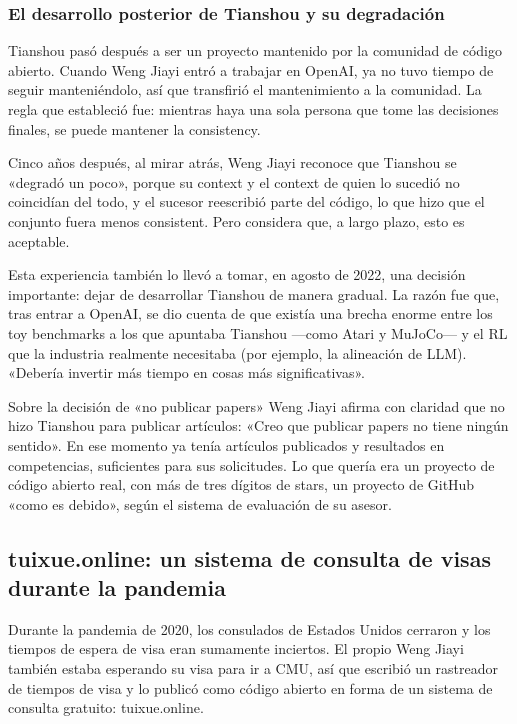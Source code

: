 \subsubsection{El desarrollo posterior de Tianshou y su degradación}

Tianshou pasó después a ser un proyecto mantenido por la comunidad de código abierto. Cuando Weng Jiayi entró a trabajar en OpenAI, ya no tuvo tiempo de seguir manteniéndolo, así que transfirió el mantenimiento a la comunidad. La regla que estableció fue: mientras haya una sola persona que tome las decisiones finales, se puede mantener la consistency.

Cinco años después, al mirar atrás, Weng Jiayi reconoce que Tianshou se «degradó un poco», porque su context y el context de quien lo sucedió no coincidían del todo, y el sucesor reescribió parte del código, lo que hizo que el conjunto fuera menos consistent. Pero considera que, a largo plazo, esto es aceptable.

Esta experiencia también lo llevó a tomar, en agosto de 2022, una decisión importante: dejar de desarrollar Tianshou de manera gradual. La razón fue que, tras entrar a OpenAI, se dio cuenta de que existía una brecha enorme entre los toy benchmarks a los que apuntaba Tianshou —como Atari y MuJoCo— y el RL que la industria realmente necesitaba (por ejemplo, la alineación de LLM). «Debería invertir más tiempo en cosas más significativas».

\begin{warningbox}{Sobre la decisión de «no publicar papers»}
Weng Jiayi afirma con claridad que no hizo Tianshou para publicar artículos: «Creo que publicar papers no tiene ningún sentido». En ese momento ya tenía artículos publicados y resultados en competencias, suficientes para sus solicitudes. Lo que quería era un proyecto de código abierto real, con más de tres dígitos de stars, un proyecto de GitHub «como es debido», según el sistema de evaluación de su asesor.
\end{warningbox}

\subsection{tuixue.online: un sistema de consulta de visas durante la pandemia}

Durante la pandemia de 2020, los consulados de Estados Unidos cerraron y los tiempos de espera de visa eran sumamente inciertos. El propio Weng Jiayi también estaba esperando su visa para ir a CMU, así que escribió un rastreador de tiempos de visa y lo publicó como código abierto en forma de un sistema de consulta gratuito: tuixue.online.


